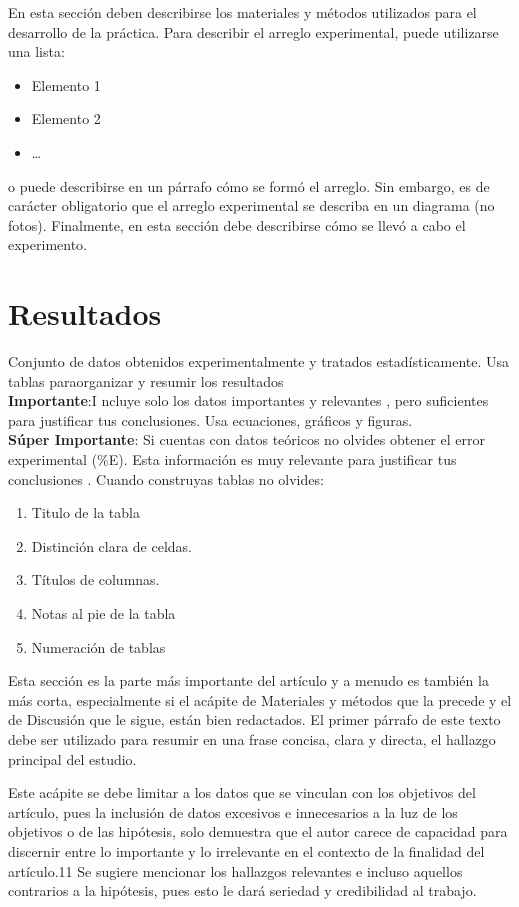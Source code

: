 \documentclass[%
 reprint,
groupedaddress,
unsortedaddress,
 amsmath,amssymb,
 aps,
superscriptaddress
]{revtex4-2}
\begin{document}
En esta secci\'on deben describirse los materiales y métodos utilizados para el 
desarrollo de la práctica. Para describir el arreglo experimental, puede utilizarse una 
lista:
\begin{itemize}
	\item Elemento 1
	\item Elemento 2
	\item \ldots
\end{itemize}
o puede describirse en un párrafo cómo se formó el arreglo. Sin embargo, es de carácter 
obligatorio que el arreglo experimental se describa en un diagrama (no fotos).
Finalmente, en esta secci\'on debe describirse cómo se llevó a cabo el experimento.

\section{Resultados}
\label{Sec:res}

Conjunto  de  datos  obtenidos  experimentalmente  y  tratados  estadísticamente.  Usa  
tablas  paraorganizar y resumir los resultados\\\textbf{Importante}:I ncluye  solo  los  
datos  importantes  y  relevantes \cite{Berman1983},  pero  suficientes  para  
justificar  tus conclusiones. Usa ecuaciones, gráficos y figuras.\\\textbf{Súper  
	Importante}:
Si  cuentas  con  datos  teóricos  no  olvides  obtener  el  error  
experimental  (\%E). Esta información es muy relevante para justificar tus conclusiones 
\cite{Agarwal2001}.
Cuando construyas tablas no olvides:
\begin{enumerate}
	\item  Titulo de la tabla
	\item Distinción clara de celdas.
	\item Títulos de columnas.
	\item Notas al pie de la tabla
	\item Numeración de tablas
\end{enumerate}

Esta sección es la parte más importante del artículo y a menudo es también la más corta, 
especialmente si el acápite de Materiales y métodos que la precede y el de Discusión que 
le sigue, están bien redactados. El primer párrafo de este texto debe ser utilizado para 
resumir en una frase concisa, clara y directa, el hallazgo principal del estudio.

Este acápite se debe limitar a los datos que se vinculan con los objetivos del artículo, 
pues la inclusión de datos excesivos e innecesarios a la luz de los objetivos o de las 
hipótesis, solo demuestra que el autor carece de capacidad para discernir entre lo 
importante y lo irrelevante en el contexto de la finalidad del artículo.11 Se sugiere 
mencionar los hallazgos relevantes e incluso aquellos contrarios a la hipótesis, pues 
esto le dará seriedad y credibilidad al trabajo.
\end{document}
